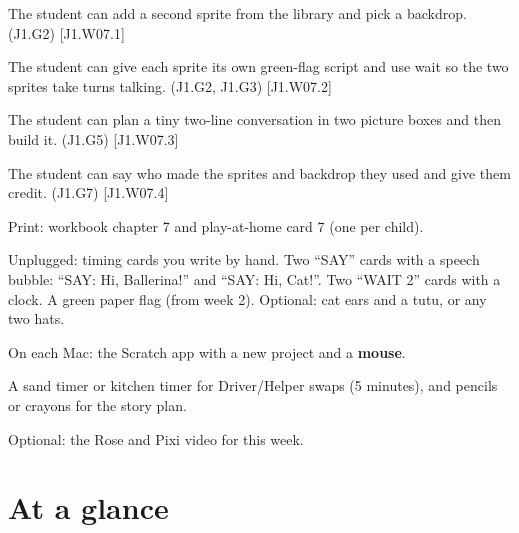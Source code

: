 
\begin{objectives}
  \item The student can add a second sprite from the library and pick a backdrop. (J1.G2) [J1.W07.1]
  \item The student can give each sprite its own green-flag script and use wait so the two sprites take turns talking. (J1.G2, J1.G3) [J1.W07.2]
  \item The student can plan a tiny two-line conversation in two picture boxes and then build it. (J1.G5) [J1.W07.3]
  \item The student can say who made the sprites and backdrop they used and give them credit. (J1.G7) [J1.W07.4]
\end{objectives}

\begin{materials}
  \item Print: workbook chapter 7 and play-at-home card 7 (one per child).
  \item Unplugged: timing cards you write by hand. Two \enquote{SAY} cards with a speech bubble: \enquote{SAY: Hi, Ballerina!} and \enquote{SAY: Hi, Cat!}. Two \enquote{WAIT 2} cards with a clock. A green paper flag (from week 2). Optional: cat ears and a tutu, or any two hats.
  \item On each Mac: the Scratch app with a new project and a \textbf{mouse}.
  \item A sand timer or kitchen timer for Driver/Helper swaps (5 minutes), and pencils or crayons for the story plan.
  \item Optional: the Rose and Pixi video for this week.
\end{materials}

\section{At a glance}
\begin{timeplan}
\end{timeplan}

